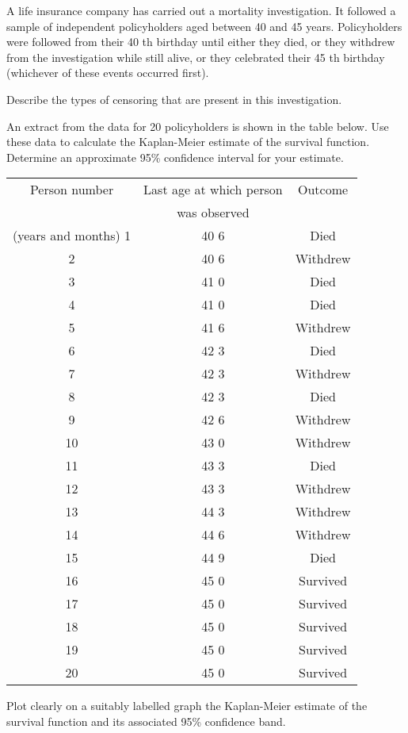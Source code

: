 \documentclass[a4paper,1pt]{article}
\begin{document}
A life insurance company has carried out a mortality investigation. It followed a
sample of independent policyholders aged between 40 and 45 years.
Policyholders were followed from their 40 th birthday until either they died, or
they withdrew from the investigation while still alive, or they celebrated their
45 th birthday (whichever of these events occurred first).
\item  Describe the types of censoring that are present in this investigation.
\item  An extract from the data for 20 policyholders is shown in the table below.
Use these data to calculate the Kaplan-Meier estimate of the survival
function. Determine an approximate 95\% confidence interval for your
estimate.

\begin{center}
\begin{tabular}{ccc}
Person number	&	Last age at which person		&	Outcome	\\	
	&	was observed		&		\\	 \hline
		(years and months)					
1	&	40	6	&	Died	\\	 \hline
2	&	40	6	&	Withdrew	\\	 \hline
3	&	41	0	&	Died	\\	 \hline
4	&	41	0	&	Died	\\	 \hline
5	&	41	6	&	Withdrew	\\	 \hline
6	&	42	3	&	Died	\\	 \hline
7	&	42	3	&	Withdrew	\\	 \hline
8	&	42	3	&	Died	\\	 \hline
9	&	42	6	&	Withdrew	\\	 \hline
10	&	43	0	&	Withdrew	\\	 \hline
11	&	43	3	&	Died	\\	 \hline
12	&	43	3	&	Withdrew	\\	 \hline
13	&	44	3	&	Withdrew	\\	 \hline
14	&	44	6	&	Withdrew	\\	 \hline
15	&	44	9	&	Died	\\	 \hline
16	&	45	0	&	Survived	\\	 \hline
17	&	45	0	&	Survived	\\	 \hline
18	&	45	0	&	Survived	\\	 \hline
19	&	45	0	&	Survived	\\	 \hline
20	&	45	0	&	Survived	\\	 \hline
\end{tabular}
\end{center}
\item 
Plot clearly on a suitably labelled graph the Kaplan-Meier estimate of the
survival function and its associated 95\% confidence band.
\end{document}
